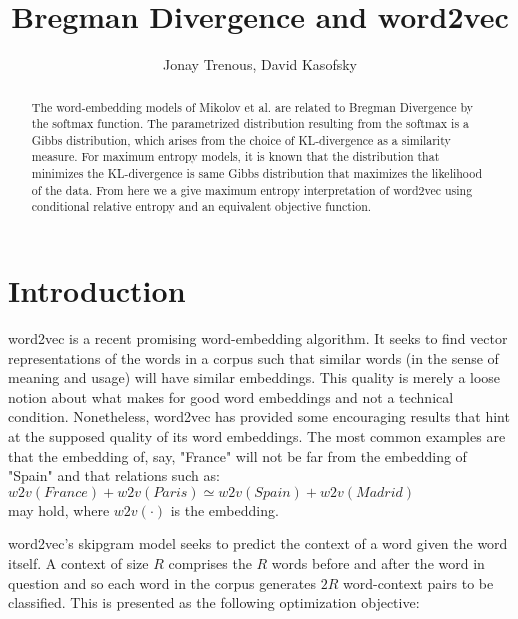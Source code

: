 \documentclass[]{article}
\title{Bregman Divergence and word2vec}
\author{Jonay Trenous, David Kasofsky}
\begin{document}
\maketitle

\begin{abstract}

\noindent The word-embedding models of Mikolov et al.\cite{word2vec1}\cite{word2vec2} are related to Bregman Divergence by the softmax function. The parametrized distribution resulting from the softmax is a Gibbs distribution, which arises from the choice of KL-divergence as a similarity measure. For maximum entropy models, it is known that the distribution that minimizes the KL-divergence is same Gibbs distribution that maximizes the likelihood of the data. From here we a give maximum entropy interpretation of word2vec using conditional relative entropy and an equivalent objective function.

\end{abstract}

\section{Introduction}

word2vec\cite{word2vec1}\cite{word2vec2} is a recent promising word-embedding algorithm. It seeks to find vector representations of the words in a corpus such that similar words (in the sense of meaning and usage) will have similar embeddings. This quality is merely a loose notion about what makes for good word embeddings and not a technical condition. Nonetheless, word2vec has provided some encouraging results that hint at the supposed quality of its word embeddings. The most common examples are that the embedding of, say, "France" will not be far from the embedding of "Spain" and that relations such as:\\

$w2v(France) + w2v(Paris) \simeq w2v(Spain) + w2v(Madrid)$\\

\noindent may hold, where $w2v(\cdot)$ is the embedding.

word2vec's skipgram model seeks to predict the context of a word given the word itself. A context of size $R$ comprises the $R$ words before and after the word in question and so each word in the corpus generates $2R$ word-context pairs to be classified. This is presented as the following optimization objective:\\
\end{document}
